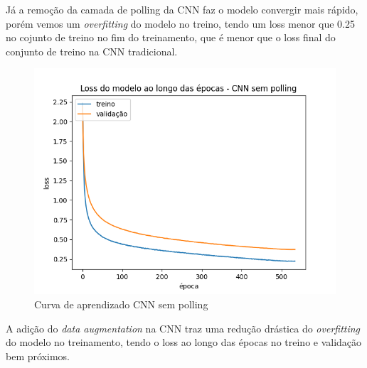 \documentclass[12pt]{article}
\begin{document}
Já a remoção da camada de polling da CNN faz o modelo convergir mais rápido, porém vemos um \textit{overfitting} do modelo no treino, tendo um loss menor que 0.25 no cojunto de treino no fim do treinamento, que é menor que o loss final do conjunto de treino na CNN tradicional. 


\begin{figure}[ht]
  \centering
  \includegraphics[width=.5\textwidth]{../images/results_plt/cnn_sem_polling_loss_progress.png}
  \caption{Curva de aprendizado CNN sem polling}
  \label{fig:cnn_sem_polling_loss_progress}
\end{figure}

A adição do \textit{data augmentation} na CNN traz uma redução drástica do \textit{overfitting} do modelo no treinamento, tendo o loss ao longo das épocas no treino e validação bem próximos.
\end{document}
